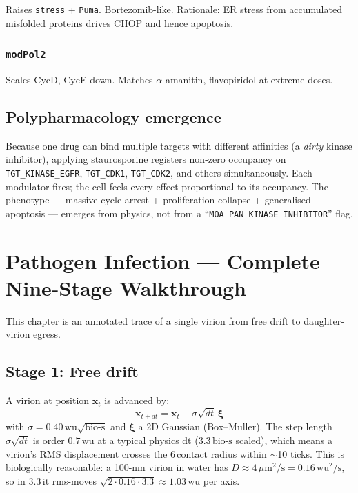\documentclass[11pt,letterpaper,twoside,openany]{book}
\newcommand{\code}[1]{\texttt{#1}}
\newcommand{\biosec}{\text{bio-s}}
\newcommand{\wu}{\text{wu}}
\newcommand{\um}{\ensuremath{\mu\text{m}}}
\begin{document}
Raises \code{stress} + \code{Puma}. Bortezomib-like. Rationale: ER
stress from accumulated misfolded proteins drives CHOP and hence
apoptosis.

\subsection{\code{modPol2}}

Scales CycD, CycE down. Matches $\alpha$-amanitin,
flavopiridol at extreme doses.

\section{Polypharmacology emergence}

Because one drug can bind multiple targets with different
affinities (a \emph{dirty} kinase inhibitor), applying
staurosporine registers non-zero occupancy on
\code{TGT\_KINASE\_EGFR}, \code{TGT\_CDK1}, \code{TGT\_CDK2}, and
others simultaneously. Each modulator fires; the cell feels every
effect proportional to its occupancy. The phenotype --- massive
cycle arrest + proliferation collapse + generalised apoptosis ---
emerges from physics, not from a
``\code{MOA\_PAN\_KINASE\_INHIBITOR}'' flag.

\chapter{Pathogen Infection --- Complete Nine-Stage Walkthrough}
\label{ch:infection-deep}

This chapter is an annotated trace of a single virion from free
drift to daughter-virion egress.

\section{Stage 1: Free drift}

A virion at position $\mathbf{x}_t$ is advanced by:
\begin{equation}
  \mathbf{x}_{t+dt} = \mathbf{x}_t + \sigma\sqrt{dt}\,\boldsymbol{\xi}
\end{equation}
with $\sigma = 0.40\,\wu\sqrt{\biosec}$ and $\boldsymbol{\xi}$ a
2D Gaussian (Box--Muller). The step length $\sigma\sqrt{dt}$ is
order $0.7\,\wu$ at a typical physics dt ($3.3\,\biosec$ scaled),
which means a virion's RMS displacement crosses the 6\,\wu contact
radius within $\sim$10 ticks. This is biologically reasonable: a
100-nm virion in water has $D\approx 4\,\um^2/\text{s} =
0.16\,\wu^2/\text{s}$, so in 3.3\,\biosec it rms-moves
$\sqrt{2\cdot 0.16\cdot 3.3}\approx 1.03\,\wu$ per axis.
\end{document}
